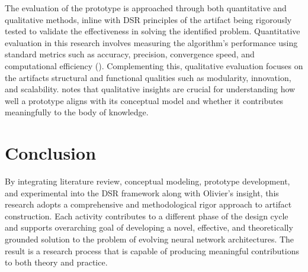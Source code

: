 \noindent The evaluation of the prototype is approached through both quantitative and qualitative methods, inline with DSR principles of the artifact being rigorously tested to validate the effectiveness in solving the identified problem. Quantitative evaluation in this research involves measuring the algorithm's performance using standard metrics such as accuracy, precision, convergence speed, and computational efficiency (\cite{gregar2023research}).  Complementing this, qualitative evaluation focuses on the artifacts structural and functional qualities such as modularity, innovation, and scalability. \cite{olivier2009information} notes that qualitative insights are crucial for understanding how well a prototype aligns with its conceptual model and whether it contributes meaningfully to the body of knowledge.

\section{Conclusion}
By integrating literature review, conceptual modeling, prototype development, and experimental into the DSR framework along with Olivier's insight, this research adopts a comprehensive and methodological rigor approach to artifact construction. Each activity contributes to a different phase of the design cycle and supports overarching goal of developing a novel, effective, and theoretically grounded solution to the problem of evolving neural network architectures. The result is a research process that is capable of producing meaningful contributions to both theory and practice.
